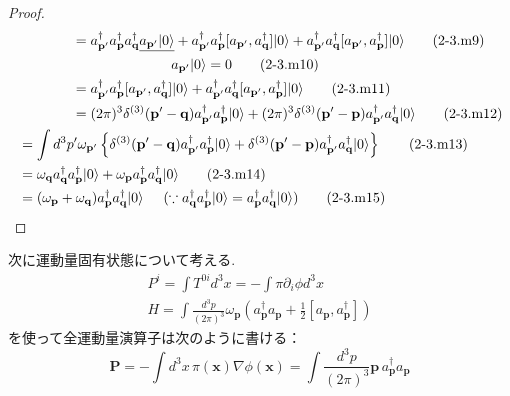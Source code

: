 \documentclass[a4paper,12pt]{article}
\begin{document}
\begin{proof}
\begin{align*}
    &\quad \hspace{1cm} = a_{\mathbf{p}'}^{\dagger} a_{\mathbf{p}}^{\dagger} a_{\mathbf{q}}^{\dagger} \underline{a_{\mathbf{p}'} \lvert 0 \rangle} + a_{\mathbf{p}'}^{\dagger} a_{\mathbf{p}}^{\dagger} [a_{\mathbf{p}'}, a_{\mathbf{q}}^{\dagger}] \lvert 0 \rangle + a_{\mathbf{p}'}^{\dagger} a_{\mathbf{q}}^{\dagger} [a_{\mathbf{p}'}, a_{\mathbf{p}}^{\dagger}] \lvert 0 \rangle \tag{2-3.m9}\\
    &\quad \hspace{3.5cm} a_{\mathbf{p}'} \lvert 0 \rangle = 0 \tag{2-3.m10}\\
    &\quad \hspace{1cm} = a_{\mathbf{p}'}^{\dagger} a_{\mathbf{p}}^{\dagger} [a_{\mathbf{p}'}, a_{\mathbf{q}}^{\dagger}] \lvert 0 \rangle + a_{\mathbf{p}'}^{\dagger} a_{\mathbf{q}}^{\dagger} [a_{\mathbf{p}'}, a_{\mathbf{p}}^{\dagger}] \lvert 0 \rangle \tag{2-3.m11}\\
    &\quad \hspace{1cm} = (2\pi)^3 \delta^{(3)}(\mathbf{p}'-\mathbf{q}) a_{\mathbf{p}'}^{\dagger} a_{\mathbf{p}}^{\dagger} \lvert 0 \rangle + (2\pi)^3 \delta^{(3)}(\mathbf{p}'-\mathbf{p}) a_{\mathbf{p}'}^{\dagger} a_{\mathbf{q}}^{\dagger} \lvert 0 \rangle \tag{2-3.m12}\\
    &= \int d^3 p' \omega_{\mathbf{p'}} \left\{ \delta^{(3)}(\mathbf{p}'-\mathbf{q}) a_{\mathbf{p}'}^{\dagger} a_{\mathbf{p}}^{\dagger} \lvert 0 \rangle + \delta^{(3)}(\mathbf{p}'-\mathbf{p}) a_{\mathbf{p}'}^{\dagger} a_{\mathbf{q}}^{\dagger} \lvert 0 \rangle \right\} \tag{2-3.m13}\\
    &= \omega_{\mathbf{q}} a_{\mathbf{q}}^{\dagger} a_{\mathbf{p}}^{\dagger} \lvert 0 \rangle + \omega_{\mathbf{p}} a_{\mathbf{p}}^{\dagger} a_{\mathbf{q}}^{\dagger} \lvert 0 \rangle \tag{2-3.m14}\\
    &= (\omega_{\mathbf{p}} + \omega_{\mathbf{q}}) a_{\mathbf{p}}^{\dagger} a_{\mathbf{q}}^{\dagger} \lvert 0 \rangle \hspace{0.5cm}(\because a_{\mathbf{q}}^{\dagger} a_{\mathbf{p}}^{\dagger} \lvert 0 \rangle = a_{\mathbf{p}}^{\dagger} a_{\mathbf{q}}^{\dagger} \lvert 0 \rangle) \tag{2-3.m15}
\end{align*}
\end{proof}

\color{black}

次に運動量固有状態について考える.
\begin{align*}
    P^i = \int T^{0i} d^3x = -\int \pi \partial_i \phi d^3 x \tag{2.19} \\
    H = \int \frac{d^3p}{(2\pi)^3} \omega_{\mathbf{p}} \left( a^\dagger_{\mathbf{p}} a_{\mathbf{p}} + \frac{1}{2} [a_{\mathbf{p}}, a^\dagger_{\mathbf{p}}] \right) \tag{2.31}
\end{align*}
を使って全運動量演算子は次のように書ける：
\begin{equation*}
\mathbf{P} = -\int d^3x\, \pi(\mathbf{x}) \nabla \phi(\mathbf{x})
= \int \frac{d^3p}{(2\pi)^3} \mathbf{p} \, a^\dagger_{\mathbf{p}} a_{\mathbf{p}}
\end{equation*}
\end{document}
